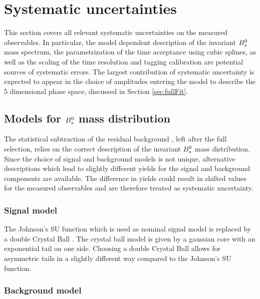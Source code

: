 \section{Systematic uncertainties}
\label{sec:Systematics}


This section covers all relevant systematic uncertainties on the measured observables.
In particular, the model dependent description of the invariant ${{B}^0_{s}}$ mass spectrum, the parametrization of the time acceptance using cubic splines, 
as well as the scaling of the time resolution and tagging calibration are potential sources of systematic errors. 
The largest contribution of systematic uncertainty is expected to appear in the choice of amplitudes entering the model to describe the 5 dimensional phase space, discussed in Section \ref{sec:fullFit}.

\subsection{Models for ${{B}^0_{s}}$ mass distribution}
\label{subsec:SystMass}

The statistical subtraction of the residual background \cite{Pivk:2004ty}, left after the full selection, relies on the correct description of the invariant ${{B}^0_{s}}$ mass distribution.
Since the choice of signal and background models is not unique, alternative descriptions which lead to slightly different yields for the signal and background components are available. 
The difference in yields could result in shifted values for the measured observables and are therefore treated as systematic uncertainty. \newline

\subsubsection{Signal model}

The Johnson's SU function which is used as nominal signal model is replaced by a double Crystal Ball \cite{CB}. 
The crystal ball model is given by a gaussian core with an exponential tail on one side. 
Choosing a double Crystal Ball allows for asymmetric tails in a slightly different way compared to the Johnson's SU function. 

\subsubsection{Background model}

